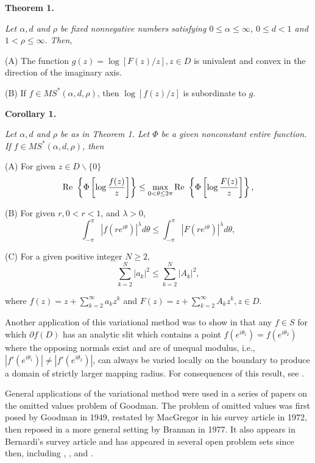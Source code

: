 \documentclass[final]{siamltex}
\begin{document}
\vspace{0.1in}

{\bf Theorem 1.} {\em Let $\alpha, d$ and $\rho$ be fixed nonnegative numbers satisfying $0 \leq \alpha \leq \infty$, $0 \leq d < 1$ and $1 < \rho \leq \infty$. Then, 

(A) The function $g(z) = \log [F(z)/z], z \in D$ is univalent and convex in the direction of the imaginary axis.

(B) If $f \in MS^*(\alpha,d,\rho)$, then $\log [f(z)/z]$ is subordinate to $g$.}

\vspace{0.1in}

{\bf Corollary 1.} {\em Let $\alpha, d$ and $\rho$ be as in Theorem 1.  Let $\Phi$ be a given nonconstant entire
function.  If $f \in MS^*(\alpha,d,\rho)$, then

(A) For given $z \in D \backslash \{0\}$ 
$${\rm Re} \  \left \{ \Phi \left [ \log \frac{f(z)}{z} \right ] \right \} \leq 
\max \limits_{0 < \theta \leq 2 \pi} {\rm Re} \  \left \{ \Phi \left [ \log \frac{F(z)}{z} \right ] \right \},$$

(B) For given $r, 0 < r < 1$, and $\lambda > 0$,
$$\int_{-\pi}^\pi |f(re^{i \theta})|^\lambda d \theta \leq \int_{-\pi}^\pi |F(re^{i \theta})|^\lambda d \theta,$$

(C) For a given positive integer $N \geq 2$,
$$\sum_{k=2}^N |a_k|^2 \leq \sum_{k=2}^N |A_k|^2,$$

\vspace{0.1in}

\noindent where $f(z) = z + \sum_{k=2}^\infty a_k z^k$ and $F(z) = z + \sum_{k=2}^\infty A_k z^k, z \in D$. }


Another application of this variational method was to show in \cite{Barnard4} that any $f \in S$ for which $\partial f(D)$
has an analytic slit which contains a point $f(e^{i \theta_1}) = f(e^{i \theta_2})$ where the opposing
normals exist and are of unequal modulus, i.e., $|f'(e^{i \theta_1})| \neq |f'(e^{i \theta_2})|$, can always be varied 
locally on the boundary to produce a domain of strictly larger mapping radius.  For consequences of this result, see 
\cite{Barnard4}.


General applications of the variational method were used in a series of papers on the omitted values problem of Goodman.  The problem of omitted values was first posed by Goodman \cite{Goodman1} in 1949, restated by MacGregor \cite{MacGregor1} in his survey article in 1972, then reposed in a more general setting by Brannan \cite{AndBarBran1} in 1977.  It also appears in Bernardi's survey article \cite{Bernardi1} and has 
appeared in several open problem sets since then, including \cite{Barnard1}, \cite{BrannanClunie1}, \cite{Goodman2} and \cite{Miller1}.
\end{document}
